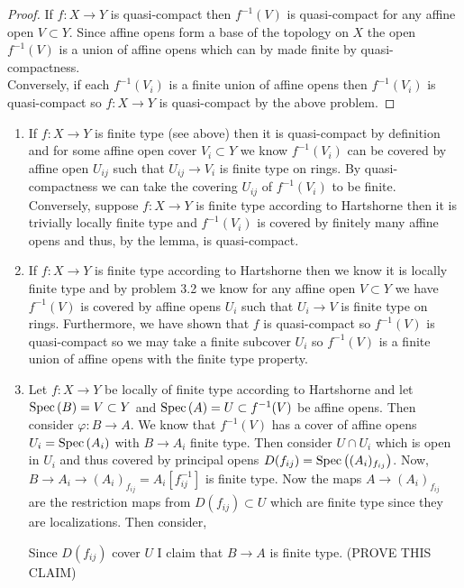\documentclass[12pt]{article}
\begin{document}
\begin{proof}
If $f : X \to Y$ is quasi-compact then $f^{-1}(V)$ is quasi-compact for any affine open $V \subset Y$. Since affine opens form a base of the topology on $X$ the open $f^{-1}(V)$ is a union of affine opens which can by made finite by quasi-compactness. 
\bigskip\\
Conversely, if each $f^{-1}(V_i)$ is a finite union of affine opens then $f^{-1}(V_i)$ is quasi-compact so $f : X \to Y$ is quasi-compact by the above problem.
\end{proof}

\begin{enumerate}
\item If $f : X \to Y$ is finite type (see above) then it is quasi-compact by definition and for some affine open cover $V_i \subset Y$ we know $f^{-1}(V_i)$ can be covered by affine open $U_{ij}$ such that $U_{ij} \to V_i$ is finite type on rings. By quasi-compactness we can take the covering $U_{ij}$ of $f^{-1}(V_i)$ to be finite. Conversely, suppose $f : X \to Y$ is finite type according to Hartshorne then it is trivially locally finite type and $f^{-1}(V_i)$ is covered by finitely many affine opens and thus, by the lemma, is quasi-compact. 

\item If $f : X \to Y$ is finite type according to Hartshorne then we know it is locally finite type and by problem 3.2 we know for any affine open $V \subset Y$ we have $f^{-1}(V)$ is covered by affine opens $U_{i}$ such that $U_{i} \to V$ is finite type on rings. Furthermore, we have shown that $f$ is quasi-compact so $f^{-1}(V)$ is quasi-compact so we may take a finite subcover $U_i$ so $f^{-1}(V)$ is a finite union of affine opens with the finite type property. 

\item Let $f : X \to Y$ be locally of finite type according to Hartshorne and let $\mathrm{Spec}\left( B \right) = V \subset Y$ and $\mathrm{Spec}\left( A \right) = U \subset f^{-1}(V)$ be affine opens. Then consider $\varphi : B \to A$. We know that $f^{-1}(V)$ has a cover of affine opens $U_i = \mathrm{Spec}\left( A_i \right)$ with $B \to A_i$ finite type. Then consider $U \cap U_i$ which is open in $U_i$ and thus covered by principal opens $D(f_{ij}) = \mathrm{Spec}\left( (A_i)_{f_{ij}} \right)$. Now, $B \to A_i \to (A_i)_{f_{ij}} = A_i[f_{ij}^{-1}]$ is finite type. Now the maps $A \to (A_i)_{f_{ij}}$ are the restriction maps from $D(f_{ij}) \subset U$ which are finite type since they are localizations. Then consider,
\begin{center}
\end{center} 
Since $D(f_{ij})$ cover $U$ I claim that $B \to A$ is finite type. (PROVE THIS CLAIM)
\end{enumerate}
\end{document}

